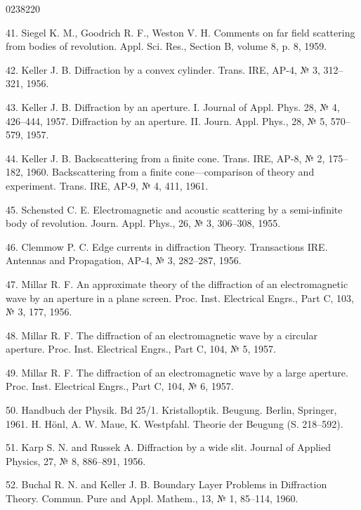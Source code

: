 \begin{scanpage}{0238}{220}
{41. Siegel K. M., Goodrich R. F., Weston V. H. Comments on far field scattering from bodies of revolution. Appl. Sci. Res., Section B, volume 8, p. 8, 1959.\par
42. Keller J. B. Diffraction by a convex cylinder. Trans. IRE, AP-4, № 3, 312--321, 1956.\par
43. Keller J. B. Diffraction by an aperture. I. Journal of Appl. Phys. 28, № 4, 426--444, 1957. Diffraction by an aperture. II. Journ. Appl. Phys., 28, № 5, 570--579, 1957.\par
44. Keller J. B. Backscattering from a finite cone. Trans. IRE, AP-8, № 2, 175--182, 1960. Backscattering from a finite cone---comparison of theory and experiment. Trans. IRE, AP-9, № 4, 411, 1961.\par
45. Schensted C. E. Electromagnetic and acoustic scattering by a semi-infinite body of revolution. Journ. Appl. Phys., 26, № 3, 306--308, 1955.\par
46. Clemmow P. C. Edge currents in diffraction Theory. Transactions IRE. Antennas and Propagation, AP-4, № 3, 282--287, 1956.\par
47. Millar R. F. An approximate theory of the diffraction of an electromagnetic wave by an aperture in a plane screen. Proc. Inst. Electrical Engrs., Part C, 103, № 3, 177, 1956.\par
48. Millar R. F. The diffraction of an electromagnetic wave by a circular aperture. Proc. Inst. Electrical Engrs., Part C, 104, № 5, 1957.\par
49. Millar R. F. The diffraction of an electromagnetic wave by a large aperture. Proc. Inst. Electrical Engrs., Part C, 104, № 6, 1957.\par
50. Handbuch der Physik. Bd 25/1. Kristalloptik. Beugung. Berlin, Springer, 1961. H. Hönl, A. W. Maue, K. Westpfahl. Theorie der Beugung (S. 218--592).\par
51. Karp S. N. and Russek A. Diffraction by a wide slit. Journal of Applied Physics, 27, № 8, 886--891, 1956.\par
52. Buchal R. N. and Keller J. B. Boundary Layer Problems in Diffraction Theory. Commun. Pure and Appl. Mathem., 13, № 1, 85--114, 1960.\par}
\end{scanpage}
